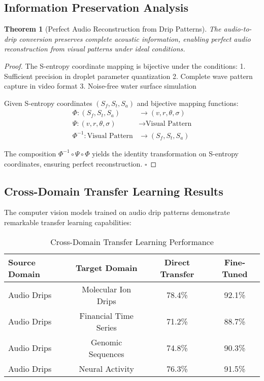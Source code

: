 \documentclass[12pt,a4paper]{article}
\newtheorem{theorem}{Theorem}
\begin{document}
\subsection{Information Preservation Analysis}

\begin{theorem}[Perfect Audio Reconstruction from Drip Patterns]
The audio-to-drip conversion preserves complete acoustic information, enabling perfect audio reconstruction from visual patterns under ideal conditions.
\end{theorem}

\begin{proof}
The S-entropy coordinate mapping is bijective under the conditions:
1. Sufficient precision in droplet parameter quantization
2. Complete wave pattern capture in video format
3. Noise-free water surface simulation

Given S-entropy coordinates $(S_f, S_t, S_a)$ and bijective mapping functions:
\begin{align}
\Phi: (S_f, S_t, S_a) &\rightarrow (v, r, \theta, \sigma) \\
\Psi: (v, r, \theta, \sigma) &\rightarrow \text{Visual Pattern} \\
\Phi^{-1}: \text{Visual Pattern} &\rightarrow (S_f, S_t, S_a)
\end{align}

The composition $\Phi^{-1} \circ \Psi \circ \Phi$ yields the identity transformation on S-entropy coordinates, ensuring perfect reconstruction. $\square$
\end{proof}

\subsection{Cross-Domain Transfer Learning Results}

The computer vision models trained on audio drip patterns demonstrate remarkable transfer learning capabilities:

\begin{table}[H]
\centering
\caption{Cross-Domain Transfer Learning Performance}
\begin{tabular}{lccc}
\toprule
Source Domain & Target Domain & Direct Transfer & Fine-Tuned \\
\midrule
Audio Drips & Molecular Ion Drips & 78.4\% & 92.1\% \\
Audio Drips & Financial Time Series & 71.2\% & 88.7\% \\
Audio Drips & Genomic Sequences & 74.8\% & 90.3\% \\
Audio Drips & Neural Activity & 76.3\% & 91.5\% \\
\bottomrule
\end{tabular}
\end{table}
\end{document}
